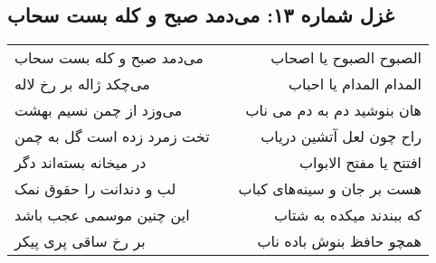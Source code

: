 \begin{center}
\section*{غزل شماره ۱۳: می‌دمد صبح و کله بست سحاب}
\label{sec:sh013}
\begin{longtable}{l p{0.5cm} r}
می‌دمد صبح و کله بست سحاب
&&
الصبوح الصبوح یا اصحاب
\\
می‌چکد ژاله بر رخ لاله
&&
المدام المدام یا احباب
\\
می‌وزد از چمن نسیم بهشت
&&
هان بنوشید دم به دم می ناب
\\
تخت زمرد زده است گل به چمن
&&
راح چون لعل آتشین دریاب
\\
در میخانه بسته‌اند دگر
&&
افتتح یا مفتح الابواب
\\
لب و دندانت را حقوق نمک
&&
هست بر جان و سینه‌های کباب
\\
این چنین موسمی عجب باشد
&&
که ببندند میکده به شتاب
\\
بر رخ ساقی پری پیکر
&&
همچو حافظ بنوش باده ناب
\\
\end{longtable}
\end{center}
